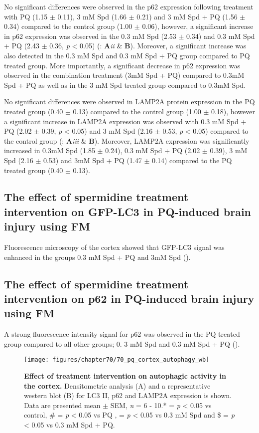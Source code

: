 No significant differences were observed in the p62 expression following treatment with PQ (1.15 $\pm$ 0.11), 3 mM Spd (1.66 $\pm$ 0.21) and 3 mM Spd + PQ (1.56 $\pm$ 0.34) compared to the control  group (1.00 $\pm$ 0.06), however, a significant increase in p62 expression was observed in the 0.3 mM Spd (2.53 $\pm$ 0.34) and 0.3 mM Spd + PQ (2.43 $\pm$ 0.36, \textit{p} < 0.05) (: \textbf{A}\textit{ii} \& \textbf{B}). Moreover, a significant increase was also detected in the 0.3 mM Spd and 0.3 mM Spd + PQ group compared to PQ treated group. More importantly, a significant decrease in p62 expression was observed in the combination treatment (3mM Spd + PQ) compared to 0.3mM Spd + PQ as well as in the 3 mM Spd treated group compared to 0.3mM Spd. 

No significant differences were observed in LAMP2A protein expression in the PQ treated group (0.40 $\pm$ 0.13) compared to the control group (1.00 $\pm$ 0.18), however a significant increase in LAMP2A expression was observed with 0.3 mM Spd + PQ (2.02 $\pm$ 0.39, \textit{p} < 0.05) and 3 mM Spd (2.16 $\pm$ 0.53, \textit{p} < 0.05) compared to the control group  (: \textbf{A}\textit{iii} \& \textbf{B}). Moreover, LAMP2A expression was significantly increased in 0.3mM Spd (1.85 $\pm$ 0.24), 0.3 mM Spd + PQ (2.02 $\pm$ 0.39), 3 mM Spd (2.16 $\pm$ 0.53) and 3mM Spd + PQ (1.47 $\pm$ 0.14) compared to the PQ treated group (0.40 $\pm$ 0.13).

\subsection{The effect of spermidine treatment intervention on GFP-LC3 in PQ-induced brain injury using FM}
Fluorescence microscopy of the cortex showed that GFP-LC3 signal was enhanced in the groups 0.3 mM Spd + PQ and 3mM Spd ().

\subsection{The effect of spermidine treatment intervention on p62 in PQ-induced brain injury using FM}
A strong fluorescence intensity signal for p62 was observed in the PQ treated group compared to all other groups; 0. 3 mM Spd and 0.3 mM Spd + PQ ().

\begin{landscape}
\begin{figure}[!htbp]
\center
  \texttt{[image: figures/chapter70/70\_pq\_cortex\_autophagy\_wb]}
  \caption[Effect of treatment intervention on autophagic activity in the cortex]{\textbf{Effect of treatment intervention on autophagic activity in the cortex.} Densitometric analysis (A) and a representative western blot (B) for LC3 II, p62 and LAMP2A expression is shown. Data are presented  mean $\pm$ SEM, \textit{n} = 6 - 10.* = \textit{p} < 0.05 vs control, \# = \textit{p} < 0.05 vs PQ , \@ = \textit{p} < 0.05 vs 0.3 mM Spd and \$ = \textit{p} < 0.05 vs 0.3 mM Spd + PQ.}
  \label{fig:70_pq_cortex_autophagy_wb}
\end{figure} 
\end{landscape}

